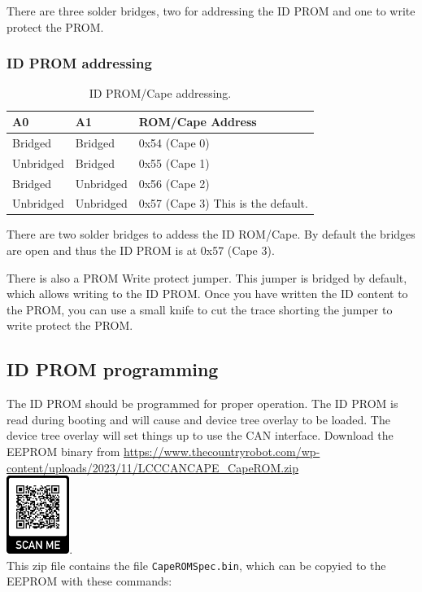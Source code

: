 \documentclass[12pt,twoside]{article}
\begin{document}
There are three solder bridges, two for addressing the ID PROM and one to
write protect the PROM.

\subsubsection{ID PROM addressing}

\begin{table}[htp]
\begin{centering}\begin{tabular}{|l|l|p{2in}|}
\hline
A0&A1&ROM/Cape Address\\
\hline
Bridged&Bridged&0x54 (Cape 0)\\
\hline
Unbridged&Bridged&0x55 (Cape 1)\\
\hline
Bridged&Unbridged&0x56 (Cape 2)\\
\hline
Unbridged&Unbridged&0x57 (Cape 3) This is the default.\\
\hline
\hline
\end{tabular}
\caption{ID PROM/Cape addressing.}
\end{centering}\end{table}

There are two solder bridges to addess the ID ROM/Cape. By default the bridges 
are open and thus the ID PROM is at 0x57 (Cape 3).

There is also a PROM Write protect jumper.  This jumper is bridged by default, 
which allows writing to the ID PROM.  Once you have written the ID content to 
the PROM, you can use a small knife to cut the trace shorting the jumper to 
write protect the PROM.

\subsection{ID PROM programming}

The ID PROM  should be programmed for proper operation.  The ID PROM is read 
during booting and will cause and device tree overlay to be loaded.  The device 
tree overlay will set things up to use the CAN interface.  Download the EEPROM 
binary from 
\url{https://www.thecountryrobot.com/wp-content/uploads/2023/11/LCCCANCAPE_CapeROM.zip} \\
\includegraphics[height=1in]{LCCCANCAPE_CapeROM_QR.png}.\\
This zip file contains the file \texttt{CapeROMSpec.bin}, which can be copyied 
to the EEPROM with these commands:
\end{document}

